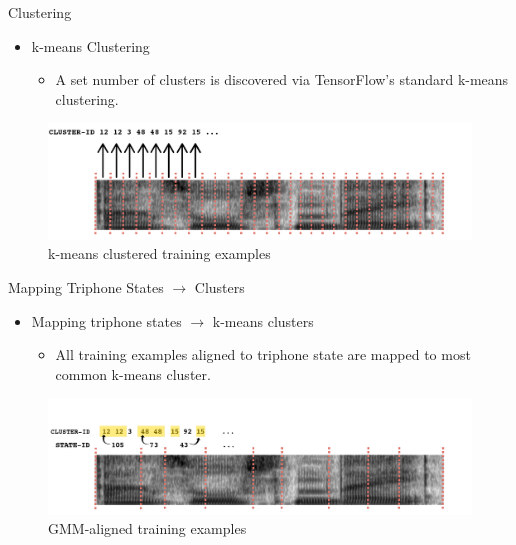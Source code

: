 \documentclass[final]{beamer} %
\begin{document}
\begin{frame}
\begin{columns}
\begin{column}{0.22\textwidth}
{\begin{block}{\boxnumber Clustering}
          \begin{itemize}
          \item k-means Clustering
            \begin{itemize}
            \item A set number of clusters is discovered via TensorFlow's standard k-means clustering.
            \end{itemize}
          \end{itemize}
        \end{block}

        \vspace{.5cm}
        
        \begin{figure}[!htbp]
          \centering
          \includegraphics[width=\linewidth]{figs/clustered.png}
          \caption{k-means clustered training examples}
          \endminipage\hfill
        \end{figure}
        
        \vspace{.5cm}
        
        \begin{block}{\boxnumber Mapping Triphone States $\rightarrow$ Clusters}          
          \begin{itemize}
          \item Mapping triphone states $\rightarrow$ k-means clusters
            \begin{itemize}
            \item All training examples aligned to triphone state are mapped to most common k-means cluster.
            \end{itemize}
          \end{itemize}
        \end{block}

        \vspace{.5cm}
        
        \begin{figure}[!htbp]
          \centering
          \includegraphics[width=\linewidth]{figs/mapped.png}
          \caption{GMM-aligned training examples}
          \endminipage\hfill
        \end{figure}
        
}
\end{column}
\end{columns}
\end{frame}
\end{document}
